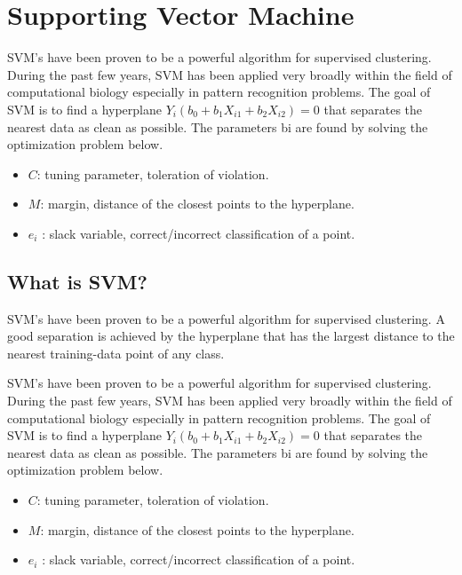 \documentclass[10pt,letterpaper]{article}
\providecommand{\tightlist}{%
  \setlength{\itemsep}{0pt}\setlength{\parskip}{0pt}}
\begin{document}
\section{Supporting Vector Machine}\label{supporting-vector-machine}

SVM's have been proven to be a powerful algorithm for supervised
clustering. During the past few years, SVM has been applied very broadly
within the field of computational biology especially in pattern
recognition problems. The goal of SVM is to find a hyperplane
\(Y_i(b_0 + b_1X_{i1} + b_2X_{i2}) = 0\) that separates the nearest data
as clean as possible. The parameters bi are found by solving the
optimization problem below.

\begin{itemize}
\tightlist
\item
  \(C\): tuning parameter, toleration of violation.
\item
  \(M\): margin, distance of the closest points to the hyperplane.
\item
  \(e_i\) : slack variable, correct/incorrect classification of a point.
\end{itemize}

\subsection{What is SVM?}\label{what-is-svm}

SVM's have been proven to be a powerful algorithm for supervised
clustering. A good separation is achieved by the hyperplane that has the
largest distance to the nearest training-data point of any class.

SVM's have been proven to be a powerful algorithm for supervised
clustering. During the past few years, SVM has been applied very broadly
within the field of computational biology especially in pattern
recognition problems. The goal of SVM is to find a hyperplane
\(Y_i(b_0 + b_1X_{i1} + b_2X_{i2}) = 0\) that separates the nearest data
as clean as possible. The parameters bi are found by solving the
optimization problem below.

\begin{itemize}
\tightlist
\item
  \(C\): tuning parameter, toleration of violation.
\item
  \(M\): margin, distance of the closest points to the hyperplane.
\item
  \(e_i\) : slack variable, correct/incorrect classification of a point.
\end{itemize}
\end{document}
